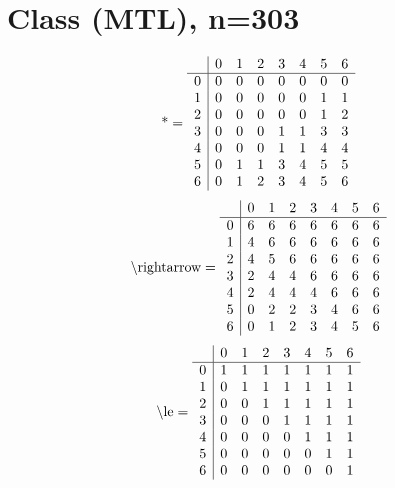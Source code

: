 \documentclass[11pt]{article}
\begin{document}
\section{Class (MTL), n=303}
\[\text{*} = 
\begin{array}{r | r r r r r r r}
 & 0 & 1 & 2 & 3 & 4 & 5 & 6 \\ \hline
0 & 0 & 0 & 0 & 0 & 0 & 0 & 0 \\
1 & 0 & 0 & 0 & 0 & 0 & 1 & 1 \\
2 & 0 & 0 & 0 & 0 & 0 & 1 & 2 \\
3 & 0 & 0 & 0 & 1 & 1 & 3 & 3 \\
4 & 0 & 0 & 0 & 1 & 1 & 4 & 4 \\
5 & 0 & 1 & 1 & 3 & 4 & 5 & 5 \\
6 & 0 & 1 & 2 & 3 & 4 & 5 & 6 \\
\end{array}
\]
\[\text{\textbackslash rightarrow} = 
\begin{array}{r | r r r r r r r}
 & 0 & 1 & 2 & 3 & 4 & 5 & 6 \\ \hline
0 & 6 & 6 & 6 & 6 & 6 & 6 & 6 \\
1 & 4 & 6 & 6 & 6 & 6 & 6 & 6 \\
2 & 4 & 5 & 6 & 6 & 6 & 6 & 6 \\
3 & 2 & 4 & 4 & 6 & 6 & 6 & 6 \\
4 & 2 & 4 & 4 & 4 & 6 & 6 & 6 \\
5 & 0 & 2 & 2 & 3 & 4 & 6 & 6 \\
6 & 0 & 1 & 2 & 3 & 4 & 5 & 6 \\
\end{array}
\]
\[\text{\textbackslash le} = 
\begin{array}{r | r r r r r r r}
 & 0 & 1 & 2 & 3 & 4 & 5 & 6 \\ \hline
0 & 1 & 1 & 1 & 1 & 1 & 1 & 1 \\
1 & 0 & 1 & 1 & 1 & 1 & 1 & 1 \\
2 & 0 & 0 & 1 & 1 & 1 & 1 & 1 \\
3 & 0 & 0 & 0 & 1 & 1 & 1 & 1 \\
4 & 0 & 0 & 0 & 0 & 1 & 1 & 1 \\
5 & 0 & 0 & 0 & 0 & 0 & 1 & 1 \\
6 & 0 & 0 & 0 & 0 & 0 & 0 & 1 \\
\end{array}
\]
\end{document}
